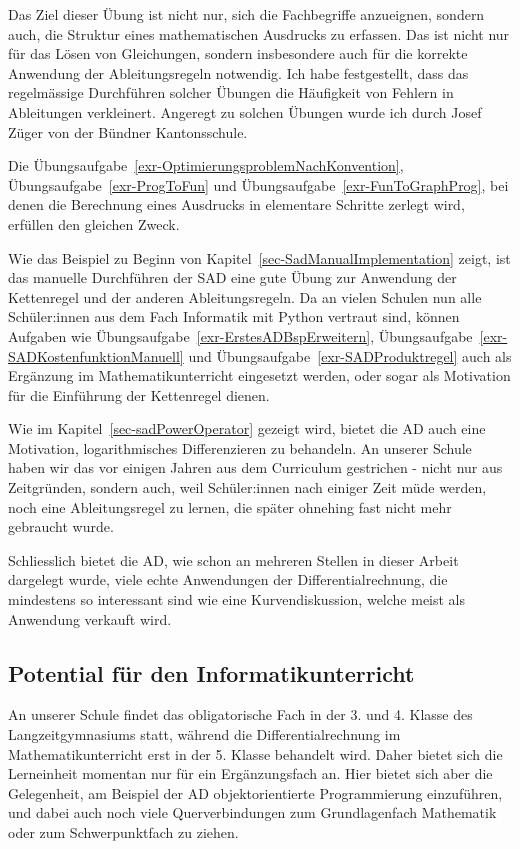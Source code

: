 \documentclass[
  a4paper,
  DIV=11]{scrreprt}
\theoremstyle{definition}
\theoremstyle{definition}
\theoremstyle{remark}
\begin{document}
Das Ziel dieser Übung ist nicht nur, sich die Fachbegriffe anzueignen,
sondern auch, die Struktur eines mathematischen Ausdrucks zu erfassen.
Das ist nicht nur für das Lösen von Gleichungen, sondern insbesondere
auch für die korrekte Anwendung der Ableitungsregeln notwendig. Ich habe
festgestellt, dass das regelmässige Durchführen solcher Übungen die
Häufigkeit von Fehlern in Ableitungen verkleinert. Angeregt zu solchen
Übungen wurde ich durch Josef Züger von der Bündner Kantonsschule.

Die Übungsaufgabe~\ref{exr-OptimierungsproblemNachKonvention},
Übungsaufgabe~\ref{exr-ProgToFun} und
Übungsaufgabe~\ref{exr-FunToGraphProg}, bei denen die Berechnung eines
Ausdrucks in elementare Schritte zerlegt wird, erfüllen den gleichen
Zweck.

Wie das Beispiel zu Beginn von Kapitel~\ref{sec-SadManualImplementation}
zeigt, ist das manuelle Durchführen der SAD eine gute Übung zur
Anwendung der Kettenregel und der anderen Ableitungsregeln. Da an vielen
Schulen nun alle Schüler:innen aus dem Fach Informatik mit Python
vertraut sind, können Aufgaben wie
Übungsaufgabe~\ref{exr-ErstesADBspErweitern},
Übungsaufgabe~\ref{exr-SADKostenfunktionManuell} und
Übungsaufgabe~\ref{exr-SADProduktregel} auch als Ergänzung im
Mathematikunterricht eingesetzt werden, oder sogar als Motivation für
die Einführung der Kettenregel dienen.

Wie im Kapitel~\ref{sec-sadPowerOperator} gezeigt wird, bietet die AD
auch eine Motivation, logarithmisches Differenzieren zu behandeln. An
unserer Schule haben wir das vor einigen Jahren aus dem Curriculum
gestrichen - nicht nur aus Zeitgründen, sondern auch, weil Schüler:innen
nach einiger Zeit müde werden, noch eine Ableitungsregel zu lernen, die
später ohnehing fast nicht mehr gebraucht wurde.

Schliesslich bietet die AD, wie schon an mehreren Stellen in dieser
Arbeit dargelegt wurde, viele echte Anwendungen der
Differentialrechnung, die mindestens so interessant sind wie eine
Kurvendiskussion, welche meist als Anwendung verkauft wird.

\hypertarget{potential-fuxfcr-den-informatikunterricht}{%
\subsection{Potential für den
Informatikunterricht}\label{potential-fuxfcr-den-informatikunterricht}}

An unserer Schule findet das obligatorische Fach in der 3. und 4. Klasse
des Langzeitgymnasiums statt, während die Differentialrechnung im
Mathematikunterricht erst in der 5. Klasse behandelt wird. Daher bietet
sich die Lerneinheit momentan nur für ein Ergänzungsfach an. Hier bietet
sich aber die Gelegenheit, am Beispiel der AD objektorientierte
Programmierung einzuführen, und dabei auch noch viele Querverbindungen
zum Grundlagenfach Mathematik oder zum Schwerpunktfach zu ziehen.
\end{document}
